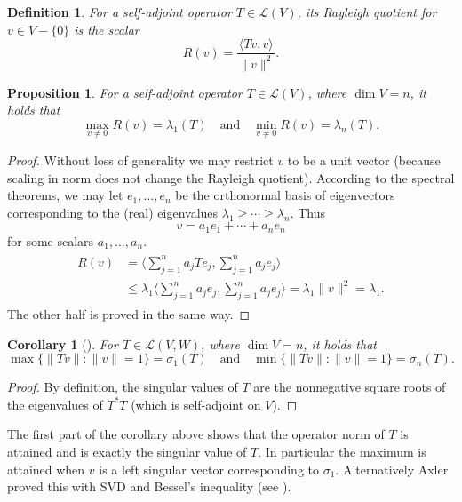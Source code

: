 \documentclass[10pt]{article}
\numberwithin{equation}{section}
\theoremstyle{plain-star}
\newtheorem{prop}[equation]{Proposition}
\newtheorem{cor}[equation]{Corollary}
\theoremstyle{definition-star}
\newtheorem{defn}[equation]{Definition}
\theoremstyle{remark-star}
\theoremstyle{plain-star}
\newcommand{\la}{\langle}
\newcommand{\ra}{\rangle}
\newcommand{\inp}[2]{\langle #1, #2 \rangle}
\newcommand{\nm}[1]{\lVert #1 \rVert}
\newcommand{\LV}{\mathcal{L}(V)}
\newcommand{\LVW}{\mathcal{L}(V,W)}
\newcommand{\df}[1]{\textit{#1}}
\begin{document}
\begin{defn}
    For a self-adjoint operator $T \in \LV$, its \df{Rayleigh quotient} for $v \in V - \{0\}$ is the scalar \[R(v) = \frac{\inp{Tv}{v}}{\nm{v}^2}.\]
\end{defn}

\begin{prop}\label{prop:rayleigh-eigen}
    For a self-adjoint operator $T \in \LV$, where $\dim V = n$, it holds that \[
        \max_{v \neq 0} R(v) = \lambda_1(T)\quad \text{and} \quad \min_{v \neq 0} R(v) = \lambda_n(T).
    \]
\end{prop}

\begin{proof}
    Without loss of generality we may restrict $v$ to be a unit vector (because scaling in norm does not change the Rayleigh quotient). According to the spectral theorems, we may let $e_1,\dotsc,e_n$ be the orthonormal basis of eigenvectors corresponding to the (real) eigenvalues $\lambda_1\geq\dotsb\geq\lambda_n$. Thus \[
        v = a_1 e_1 + \dotsb + a_n e_n
    \] for some scalars $a_1,\dotsc,a_n$. 
    \begin{align} \begin{split} \label{eq:rayleigh-expansion}
        R(v) & = \biggl\la \sum_{j=1}^n a_jTe_j,\sum_{j=1}^n a_je_j\biggr\ra \\
        & \leq \lambda_1 \biggl\la \sum_{j=1}^n a_je_j, \sum_{j=1}^n a_je_j\biggr\ra = \lambda_1 \nm{v}^2 = \lambda_1. \end{split}
    \end{align} 
    The other half is proved in the same way.
\end{proof}

\begin{cor}[{\cite[Exercise~7E.4]{axler2024}}]\label{cor:rayleigh-sing}
    For $T \in \LVW$, where $\dim V = n$, it holds that \[
        \max\{\nm{Tv}:\nm{v} = 1\} = \sigma_1(T)\quad \text{and}\quad \min\{\nm{Tv}:\nm{v} = 1\} = \sigma_n(T).
    \]
\end{cor}
\begin{proof}
    By definition, the singular values of $T$ are the nonnegative square roots of the eigenvalues of $T^*T$ (which is self-adjoint on $V$).
\end{proof}
The first part of the corollary above shows that the operator norm of $T$ is attained and is exactly the singular value of $T$. In particular the maximum is attained when $v$ is a left singular vector corresponding to $\sigma_1$. Alternatively Axler proved this with SVD and Bessel's inequality (see \cite[Section 7F]{axler2024}).
\end{document}
